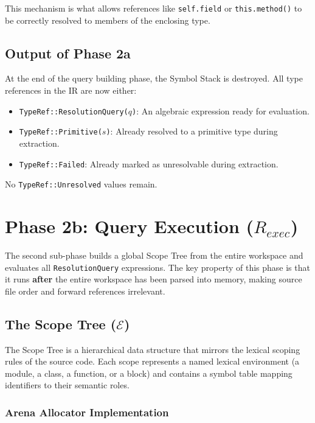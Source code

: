 This mechanism is what allows references like \texttt{self.field} or
\texttt{this.method()} to be correctly resolved to members of the
enclosing type.

\subsection{Output of Phase 2a}

At the end of the query building phase, the Symbol Stack is
destroyed. All type references in the IR are now either:
\begin{itemize}
  \item \texttt{TypeRef::ResolutionQuery($q$)}: An algebraic
    expression ready for evaluation.
  \item \texttt{TypeRef::Primitive($s$)}: Already resolved to a
    primitive type during extraction.
  \item \texttt{TypeRef::Failed}: Already marked as unresolvable
    during extraction.
\end{itemize}

No \texttt{TypeRef::Unresolved} values remain.

\section{Phase 2b: Query Execution ($R_{exec}$)}
\label{sec:query_execution}

The second sub-phase builds a global Scope Tree from the entire
workspace and evaluates all \texttt{ResolutionQuery} expressions. The
key property of this phase is that it runs \textbf{after} the entire
workspace has been parsed into memory, making source file order and
forward references irrelevant.

\subsection{The Scope Tree ($\mathcal{E}$)}
\label{sec:scope_tree}

The Scope Tree is a hierarchical data structure that mirrors the
lexical scoping rules of the source code. Each scope represents a
named lexical environment (a module, a class, a function, or a block)
and contains a symbol table mapping identifiers to their semantic roles.

\subsubsection{Arena Allocator Implementation}

